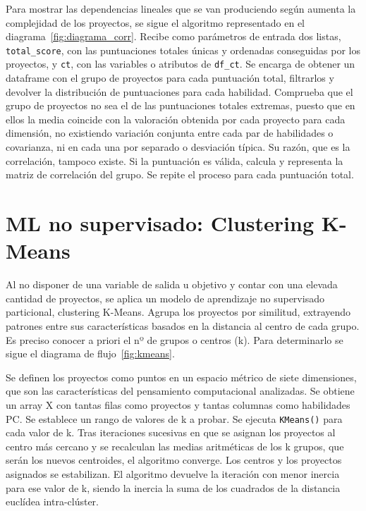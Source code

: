 \documentclass[a4paper, 12pt]{book}
\begin{document}
Para mostrar las dependencias lineales que se van produciendo según aumenta la complejidad de los proyectos, se sigue el algoritmo representado en el diagrama~\ref{fig:diagrama_corr}. Recibe como parámetros de entrada dos listas, \texttt{total\_score}, con las puntuaciones totales únicas y ordenadas conseguidas por los proyectos, y \texttt{ct}, con las variables o atributos de \texttt{df\_ct}. Se encarga de obtener un dataframe con el grupo de proyectos para cada puntuación total, filtrarlos y devolver la distribución de puntuaciones para cada habilidad. Comprueba que el grupo de proyectos no sea el de las puntuaciones totales extremas, puesto que en ellos la media coincide con la valoración obtenida por cada proyecto para cada dimensión, no existiendo variación conjunta entre cada par de habilidades o covarianza, ni en cada una por separado o desviación típica. Su razón, que es la correlación, tampoco existe. Si la puntuación es válida, calcula y representa la matriz de correlación del grupo. Se repite el proceso para cada puntuación total. 

\section{ML no supervisado: Clustering K-Means}  
\label{sec:k_means diseño}

Al no disponer de una variable de salida u objetivo y contar con una elevada cantidad de proyectos, se aplica un modelo de aprendizaje no supervisado particional, clustering K-Means. Agrupa los proyectos por similitud, extrayendo patrones entre sus características basados en la  distancia al centro de cada grupo. Es preciso conocer a priori el nº de grupos o centros (k). Para determinarlo se sigue el diagrama de flujo~\ref{fig:kmeans}. 

Se definen los proyectos como puntos en un espacio métrico de siete dimensiones, que son las características del pensamiento computacional analizadas. Se obtiene un array X con tantas filas como proyectos y tantas columnas como habilidades PC. Se establece un rango de valores de k a probar. Se ejecuta \texttt{KMeans()} para cada valor de k. Tras iteraciones sucesivas en que se asignan los proyectos al centro más cercano y se recalculan las medias aritméticas de los k grupos, que serán los nuevos centroides, el algoritmo converge. Los centros y los proyectos asignados se estabilizan. El algoritmo devuelve la iteración con menor inercia para ese valor de k, siendo la inercia la suma de los cuadrados de la distancia euclídea intra-clúster.
\end{document}
